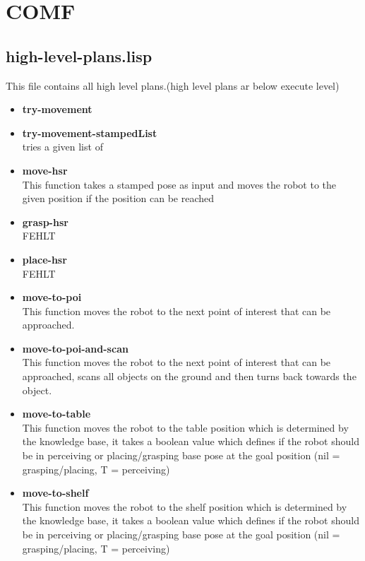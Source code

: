 \documentclass[main.tex]{subfiles}
\begin{document}
	  	\section{COMF}
	    \subsection{high-level-plans.lisp}
	    This file contains all high level plans.(high level plans ar below execute level)
	    \begin{itemize}
	    \item \textbf{try-movement} \\
	    
		\item \textbf{try-movement-stampedList} \\
		tries a given list of
	    \item \textbf{move-hsr} \\
	    This function takes a stamped pose as input and moves the robot to the given position if the position can be reached
	    \item \textbf{grasp-hsr} \\
	    FEHLT
	    \item \textbf{place-hsr} \\
	    FEHLT
	    \item \textbf{move-to-poi} \\
	    This function moves the robot to the next point of interest that can be approached. 
	    \item \textbf{move-to-poi-and-scan} \\
	    This function moves the robot to the next point of interest that can be approached, scans all objects on the ground and then turns back towards the object.
	    \item \textbf{move-to-table} \\
	    This function moves the robot to the table position which is determined by the knowledge base, it takes a boolean value which defines if the robot should be in perceiving or placing/grasping base pose at the goal position (nil = grasping/placing, T = perceiving) 
	    \item \textbf{move-to-shelf} \\
	    This function moves the robot to the shelf position which is determined by the knowledge base, it takes a boolean value which defines if the robot should be in perceiving or placing/grasping base pose at the goal position (nil = grasping/placing, T = perceiving) 
		\end{itemize}
\end{document}
